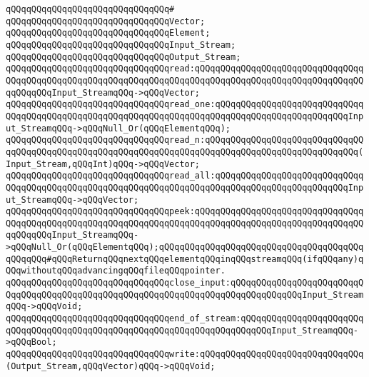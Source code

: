 \verb|qQQqqQQqqQQqqQQqqQQqqQQqqQQqqQQq#|\newline
\verb|qQQqqQQqqQQqqQQqqQQqqQQqqQQqqQQqVector;|\newline
\verb|qQQqqQQqqQQqqQQqqQQqqQQqqQQqqQQqElement;|\newline
\newline
\verb|qQQqqQQqqQQqqQQqqQQqqQQqqQQqqQQqInput_Stream;|\newline
\verb|qQQqqQQqqQQqqQQqqQQqqQQqqQQqqQQqOutput_Stream;|\newline
\newline
\verb|qQQqqQQqqQQqqQQqqQQqqQQqqQQqqQQqread:qQQqqQQqqQQqqQQqqQQqqQQqqQQqqQQqqQQqqQQqqQQqqQQqqQQqqQQqqQQqqQQqqQQqqQQqqQQqqQQqqQQqqQQqqQQqqQQqqQQqqQQqqQQqqQQqInput_StreamqQQq->qQQqVector;|\newline
\verb|qQQqqQQqqQQqqQQqqQQqqQQqqQQqqQQqread_one:qQQqqQQqqQQqqQQqqQQqqQQqqQQqqQQqqQQqqQQqqQQqqQQqqQQqqQQqqQQqqQQqqQQqqQQqqQQqqQQqqQQqqQQqqQQqqQQqInput_StreamqQQq->qQQqNull_Or(qQQqElementqQQq);|\newline
\newline
\verb|qQQqqQQqqQQqqQQqqQQqqQQqqQQqqQQqread_n:qQQqqQQqqQQqqQQqqQQqqQQqqQQqqQQqqQQqqQQqqQQqqQQqqQQqqQQqqQQqqQQqqQQqqQQqqQQqqQQqqQQqqQQqqQQqqQQqqQQq(Input_Stream,qQQqInt)qQQq->qQQqVector;|\newline
\verb|qQQqqQQqqQQqqQQqqQQqqQQqqQQqqQQqread_all:qQQqqQQqqQQqqQQqqQQqqQQqqQQqqQQqqQQqqQQqqQQqqQQqqQQqqQQqqQQqqQQqqQQqqQQqqQQqqQQqqQQqqQQqqQQqqQQqInput_StreamqQQq->qQQqVector;|\newline
\newline
\verb|qQQqqQQqqQQqqQQqqQQqqQQqqQQqqQQqpeek:qQQqqQQqqQQqqQQqqQQqqQQqqQQqqQQqqQQqqQQqqQQqqQQqqQQqqQQqqQQqqQQqqQQqqQQqqQQqqQQqqQQqqQQqqQQqqQQqqQQqqQQqqQQqqQQqInput_StreamqQQq->qQQqNull_Or(qQQqElementqQQq);qQQqqQQqqQQqqQQqqQQqqQQqqQQqqQQqqQQqqQQqqQQqqQQq#qQQqReturnqQQqnextqQQqelementqQQqinqQQqstreamqQQq(ifqQQqany)qQQqwithoutqQQqadvancingqQQqfileqQQqpointer.|\newline
\newline
\verb|qQQqqQQqqQQqqQQqqQQqqQQqqQQqqQQqclose_input:qQQqqQQqqQQqqQQqqQQqqQQqqQQqqQQqqQQqqQQqqQQqqQQqqQQqqQQqqQQqqQQqqQQqqQQqqQQqqQQqqQQqInput_StreamqQQq->qQQqVoid;|\newline
\verb|qQQqqQQqqQQqqQQqqQQqqQQqqQQqqQQqend_of_stream:qQQqqQQqqQQqqQQqqQQqqQQqqQQqqQQqqQQqqQQqqQQqqQQqqQQqqQQqqQQqqQQqqQQqqQQqqQQqInput_StreamqQQq->qQQqBool;|\newline
\newline
\verb|qQQqqQQqqQQqqQQqqQQqqQQqqQQqqQQqwrite:qQQqqQQqqQQqqQQqqQQqqQQqqQQqqQQq(Output_Stream,qQQqVector)qQQq->qQQqVoid;|\newline
